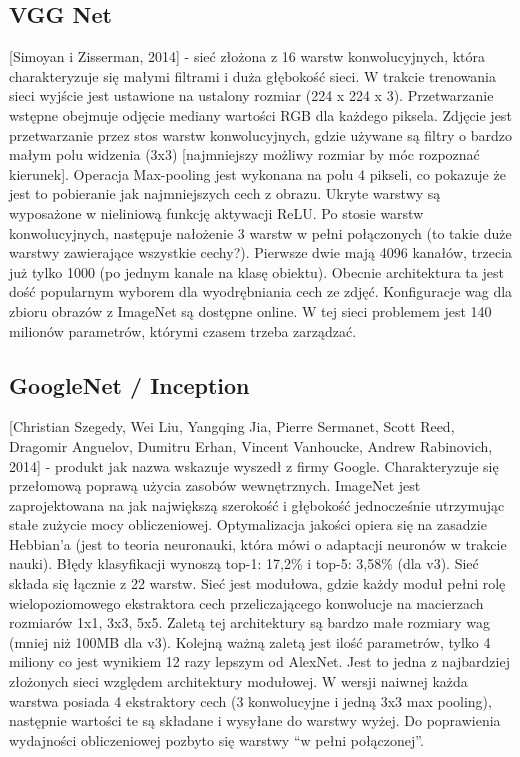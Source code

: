 \documentclass[a4paper,twoside,titlepage,openright]{book}
\begin{document}
\subsection{VGG Net}
 [Simoyan i Zisserman, 2014] - sieć złożona z 16 warstw konwolucyjnych, która charakteryzuje się małymi filtrami i duża głębokość sieci.
W trakcie trenowania sieci wyjście jest ustawione na ustalony rozmiar (224 x 224 x 3). Przetwarzanie wstępne obejmuje odjęcie mediany wartości RGB dla każdego piksela. Zdjęcie jest przetwarzanie przez stos warstw konwolucyjnych, gdzie używane są filtry o bardzo małym polu widzenia (3x3) [najmniejszy możliwy rozmiar by móc rozpoznać kierunek]. Operacja Max-pooling jest wykonana na polu 4 pikseli, co pokazuje że jest to pobieranie jak najmniejszych cech z obrazu. Ukryte warstwy są wyposażone w nieliniową funkcję aktywacji ReLU. Po stosie warstw konwolucyjnych, następuje nałożenie 3 warstw w pełni połączonych (to takie duże warstwy zawierające wszystkie cechy?). Pierwsze dwie mają 4096 kanałów, trzecia już tylko 1000 (po jednym kanale na klasę obiektu). Obecnie architektura ta jest dość popularnym wyborem dla wyodrębniania cech ze zdjęć. Konfiguracje wag dla zbioru obrazów z ImageNet są dostępne online. W tej sieci problemem jest 140 milionów parametrów, którymi czasem trzeba zarządzać.

\subsection{GoogleNet / Inception}
[Christian Szegedy, Wei Liu, Yangqing Jia, Pierre Sermanet, Scott Reed, Dragomir Anguelov, Dumitru Erhan, Vincent Vanhoucke, Andrew Rabinovich, 2014] - produkt jak nazwa wskazuje wyszedł z firmy Google. Charakteryzuje się przełomową poprawą użycia zasobów wewnętrznych. ImageNet jest zaprojektowana na jak największą szerokość i głębokość jednocześnie utrzymując stałe zużycie mocy obliczeniowej. Optymalizacja jakości opiera się na zasadzie Hebbian’a (jest to teoria neuronauki, która mówi o adaptacji neuronów w trakcie nauki). Błędy klasyfikacji wynoszą top-1: 17,2\% i top-5: 3,58\% (dla v3). Sieć składa się łącznie z 22 warstw. Sieć jest modułowa, gdzie każdy moduł pełni rolę wielopoziomowego ekstraktora cech przeliczającego konwolucje na macierzach rozmiarów 1x1, 3x3, 5x5. Zaletą tej architektury są bardzo małe rozmiary wag (mniej niż 100MB dla v3). Kolejną ważną zaletą jest ilość parametrów, tylko 4 miliony co jest wynikiem 12 razy lepszym od AlexNet. Jest to jedna z najbardziej złożonych sieci względem architektury modułowej. W wersji naiwnej każda warstwa posiada 4 ekstraktory cech (3 konwolucyjne i jedną 3x3 max pooling), następnie wartości te są składane i wysyłane do warstwy wyżej. Do poprawienia wydajności obliczeniowej pozbyto się warstwy “w pełni połączonej”.
\end{document}
